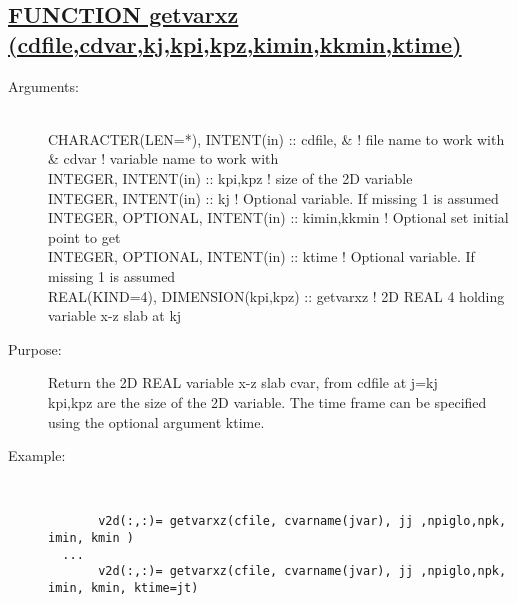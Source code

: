 \documentclass[a4paper,11pt]{article}
\begin{document}
\subsection*{\underline{FUNCTION getvarxz (cdfile,cdvar,kj,kpi,kpz,kimin,kkmin,ktime)  }}
\begin{description}
\item[Arguments:]\ \\
    CHARACTER(LEN=*), INTENT(in) :: cdfile,     \&   ! file name to work with  \\
         \&                          cdvar           ! variable name to work with  \\
    INTEGER, INTENT(in) :: kpi,kpz                  ! size of the 2D variable  \\
    INTEGER, INTENT(in) :: kj                       ! Optional variable. If missing 1 is assumed  \\
    INTEGER, OPTIONAL, INTENT(in) :: kimin,kkmin    ! Optional  set initial point to get \\
    INTEGER, OPTIONAL, INTENT(in) :: ktime          ! Optional variable. If missing 1 is assumed \\
    REAL(KIND=4), DIMENSION(kpi,kpz) :: getvarxz    ! 2D REAL 4 holding variable x-z slab at kj  \\
\item[Purpose:]  Return the 2D REAL variable x-z slab cvar, from cdfile at j=kj \\
  kpi,kpz are the  size of the 2D variable. The time frame  can be specified using the optional argument ktime.
\item[Example:]\ \\
\begin{verbatim}
       v2d(:,:)= getvarxz(cfile, cvarname(jvar), jj ,npiglo,npk, imin, kmin )
  ...
       v2d(:,:)= getvarxz(cfile, cvarname(jvar), jj ,npiglo,npk, imin, kmin, ktime=jt)
\end{verbatim}
\end{description}
\newpage
\end{document}
